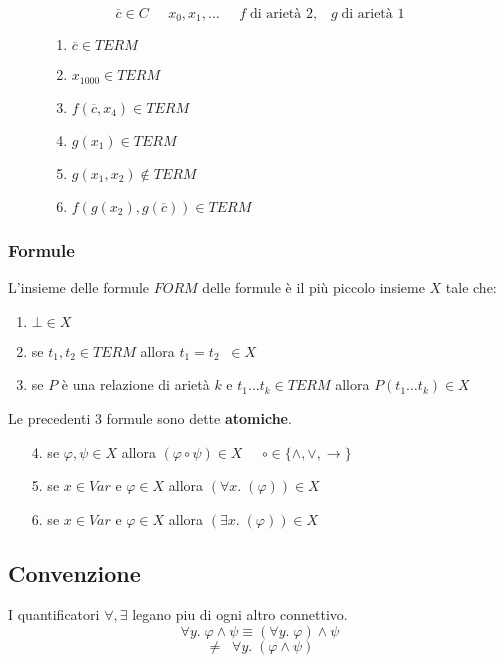 \documentclass{article}
\theoremstyle{break}
\theoremstyle{break}
\theoremstyle{break}
\theoremstyle{break}
\begin{document}
\begin{figure}[H]
  \begin{example}
    \[
      \overline{c} \in C\;\;\;\;\; x_0, x_1, \ldots \;\;\;\;\; f\; \text{di arietà 2}, \;\;\; g\; \text{di arietà 1}
    \] 
    \begin{enumerate}
      \item \( \overline{c} \in TERM \) 
      \item \( x_{1000} \in TERM \) 
      \item \( f(\overline{c}, x_4) \in TERM\) 
      \item \( g(x_1) \in TERM \) 
      \item  \( g(x_1, x_2) \notin TERM \) 
      \item \( f(g(x_2), g(\overline{c})) \in TERM \) 
    \end{enumerate}
  \end{example}
\end{figure}

\subsubsection{Formule}
L'insieme delle formule \( FORM \) delle formule è il più piccolo insieme \( X \) tale che:
\begin{enumerate}
  \item \( \bot \in X \) 
  \item se \( t_1,t_2 \in TERM \) allora \( t_1 = t_2\;\; \in X \) 
  \item se \( P \) è una relazione di arietà \( k \) e \( t_1 \ldots t_k \in TERM \) allora \( P(t_1 \ldots t_k) \in X \)
\end{enumerate}
Le precedenti 3 formule sono dette \textbf{atomiche}. 
\begin{enumerate}
  \item [4.] se \( \varphi, \psi \in X \) allora \( (\varphi \circ \psi) \in X \;\;\;\;\; \circ \in  \{\wedge, \vee, \to \} \) 
  \item [5.] se \( x \in Var \) e \( \varphi \in X \) allora \( (\forall x.\; (\varphi)) \in X \) 
  \item [6.] se \( x \in Var \) e \( \varphi \in X \) allora \( (\exists x.\; (\varphi)) \in X \) 
\end{enumerate}

\subsection{Convenzione}
I quantificatori \( \forall , \exists  \) legano piu di ogni altro connettivo.
\[
\forall y.\; \varphi \wedge \psi \equiv (\forall y.\; \varphi) \wedge \psi
\] 
\[
\neq \;\; \forall y.\; (\varphi \wedge \psi)
\] 
\end{document}
